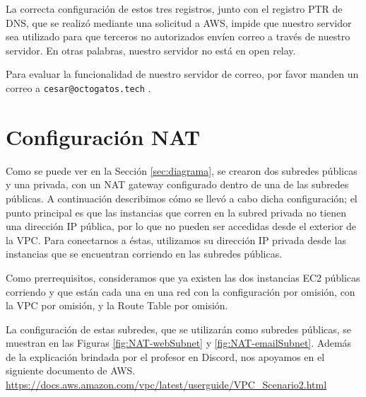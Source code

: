 \documentclass{article}
\newcommand{\ttt}[1]{%
\texttt{#1}%
}
\begin{document}
La correcta configuraci\'on de estos tres registros,
junto con el registro PTR de DNS, que se realiz\'o
mediante una solicitud a AWS, impide que nuestro
servidor sea utilizado para que terceros no autorizados
env\'ien correo a trav\'es de nuestro servidor.   En
otras palabras, nuestro servidor no est\'a en open relay.

Para evaluar la funcionalidad de nuestro servidor de
correo, por favor manden un correo a
\ttt{cesar@octogatos.tech}.



\section{Configuraci\'on NAT}

Como se puede ver en la Secci\'on \ref{sec:diagrama},
se crearon dos subredes p\'ublicas y una privada, con
un NAT gateway configurado dentro de una de las subredes
p\'ublicas.   A continuaci\'on describimos c\'omo se
llev\'o a cabo dicha configuraci\'on; el punto
principal es que las instancias que corren en la subred
privada no tienen una direcci\'on IP p\'ublica, por lo
que no pueden ser accedidas desde el exterior de la VPC.
Para conectarnos a \'estas, utilizamos su direcci\'on
IP privada desde las instancias que se encuentran corriendo
en las subredes p\'ublicas.

Como prerrequisitos, consideramos que ya existen las
dos instancias EC2 p\'ublicas corriendo y que est\'an
cada una en una red con la configuraci\'on por omisi\'on,
con la VPC por omisi\'on, y la Route Table por omisi\'on.

La configuraci\'on de estas subredes, que se
utilizar\'an como subredes p\'ublicas, se muestran en las
Figuras \ref{fig:NAT-webSubnet} y \ref{fig:NAT-emailSubnet}.
Adem\'as de la explicaci\'on brindada por el profesor en
Discord, nos apoyamos en el siguiente documento de AWS.
\href{https://docs.aws.amazon.com/vpc/latest/userguide/VPC_Scenario2.html}{https://docs.aws.amazon.com/vpc/latest/userguide/VPC\_Scenario2.html}
\end{document}

